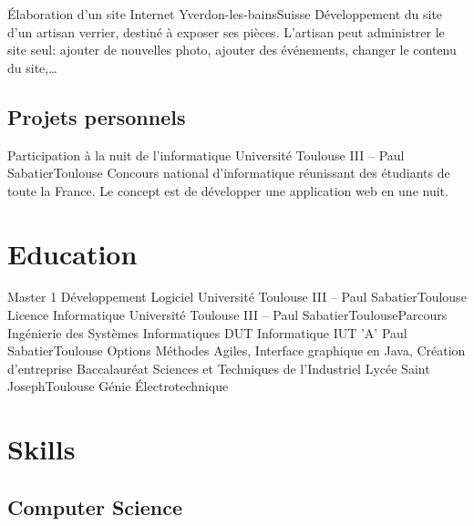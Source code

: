 \documentclass{my_cv_bis}
\begin{document}
	{Élaboration d’un site Internet}
	{Yverdon-les-bains}{Suisse}
	{Développement du site d’un artisan verrier, destiné à exposer ses pièces. L'artisan peut administrer le site
	seul: ajouter de nouvelles photo, ajouter des événements, changer le contenu du site,\ldots}
	{}

	\subsection{Projets personnels}
	{Participation à la nuit de l'informatique}
	{Université Toulouse III -- Paul Sabatier}{Toulouse}
	{ Concours national d’informatique réunissant des étudiants de toute la France. Le concept est de développer une application web en une nuit.} 
	{}
	\vspace{-20px}
\section{Education}
	{Master 1 Développement Logiciel}
	{Université Toulouse III -- Paul Sabatier}{Toulouse}{}{}
	{Licence Informatique}
	{Université Toulouse III -- Paul Sabatier}{Toulouse}{Parcours Ingénierie des Systèmes Informatiques}{}
	{DUT Informatique}
	{IUT 'A' Paul Sabatier}{Toulouse}
	{Options Méthodes Agiles, Interface graphique en Java, Création d'entreprise}
	{}
	{Baccalauréat Sciences et Techniques de l'Industriel}
	{Lycée Saint Joseph}{Toulouse}
	{Génie Électrotechnique}{}
	\vspace{-20px}
\section{Skills}
		\subsection{Computer Science}
		\\
		\\
		\\
		\\
		\\
\end{document}
